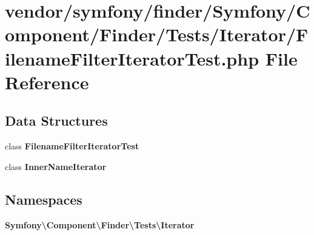 \section{vendor/symfony/finder/\+Symfony/\+Component/\+Finder/\+Tests/\+Iterator/\+Filename\+Filter\+Iterator\+Test.php File Reference}
\label{_filename_filter_iterator_test_8php}
\subsection*{Data Structures}
\begin{DoxyCompactItemize}
\item 
class {\bf Filename\+Filter\+Iterator\+Test}
\item 
class {\bf Inner\+Name\+Iterator}
\end{DoxyCompactItemize}
\subsection*{Namespaces}
\begin{DoxyCompactItemize}
\item 
 {\bf Symfony\textbackslash{}\+Component\textbackslash{}\+Finder\textbackslash{}\+Tests\textbackslash{}\+Iterator}
\end{DoxyCompactItemize}
